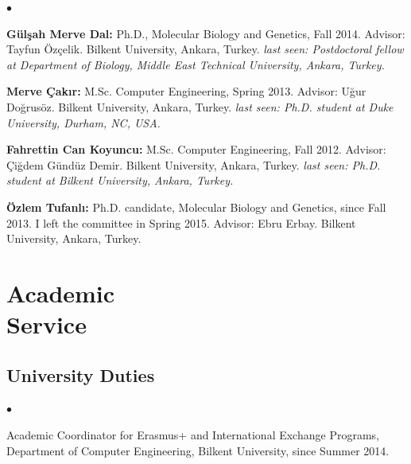 \documentclass[margin,line]{res}
\newenvironment{list2}{
  \begin{list}{$\bullet$}{%
      \setlength{\itemsep}{0in}
      \setlength{\parsep}{0in} \setlength{\parskip}{0in}
      \setlength{\topsep}{0in} \setlength{\partopsep}{0in} 
      \setlength{\leftmargin}{0.2in}}}{\end{list}}
\begin{document}
\begin{resume}
\begin{list2}
\item
  {\bf G\"{u}l\c{s}ah Merve Dal:} Ph.D., Molecular Biology and Genetics, Fall 2014.
  Advisor: Tayfun Özçelik.
  Bilkent University, Ankara, Turkey. {\it last seen: Postdoctoral fellow at Department of Biology, Middle East Technical University, Ankara, Turkey.}
\item
  {\bf Merve Çakır:} M.Sc. Computer Engineering, Spring 2013. Advisor: Uğur Doğrusöz.
  Bilkent University, Ankara, Turkey. {\it last seen: Ph.D. student at Duke University, Durham, NC, USA.}
\item
  {\bf Fahrettin Can Koyuncu:} M.Sc. Computer Engineering, Fall 2012. Advisor: Çiğdem Gündüz Demir.
  Bilkent University, Ankara, Turkey. {\it last seen: Ph.D. student at Bilkent University, Ankara, Turkey.}
\item
  {\bf Özlem Tufanlı:} Ph.D. candidate, Molecular Biology and Genetics, since Fall 2013. I left the committee in Spring 2015.
  Advisor: Ebru Erbay.
  Bilkent University, Ankara, Turkey.
  \end{list2}



\vspace*{-.2cm}
\section{\sc Academic \\ Service}
\vspace{-0.3cm}
\subsection{\small \sc University Duties}
\begin{list2}
\item
  Academic Coordinator for Erasmus+ and International Exchange Programs, Department of Computer Engineering, Bilkent University, since Summer 2014.
\end{list2}
\vspace{-0.4cm}


\end{resume}
\end{document}
